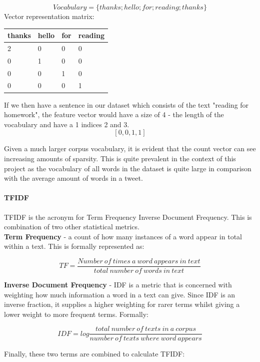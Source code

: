 \documentclass[conference]{IEEEtran}
\begin{document}
\[Vocabulary = \{thanks; hello; for; reading; thanks\} \] 
Vector representation matrix:
\begin{table}[H]
\centering
\begin{tabular}{|l|l|l|l|}
\hline
thanks & hello & for & reading \\ \hline
2      &   0   &  0  &    0 \\ \hline
0      &   1   &  0  &    0 \\ \hline
0      &   0   &  1  &    0 \\ \hline
0      &   0   &  0  &    1 \\ \hline
\end{tabular}
\end{table}

If we then have a sentence in our dataset which consists of the text "reading for homework", the feature vector would have a size of 4 - the length of the vocabulary and have a 1 indices 2 and 3.
\[ [0, 0, 1, 1]\]

Given a much larger corpus vocabulary, it is evident that the count vector can see increasing amounts of sparsity. This is quite prevalent in the context of this project as the vocabulary of all words in the dataset is quite large in comparison with the average amount of words in a tweet.\\

\paragraph{\textbf{TFIDF}}
TFIDF is the acronym for Term Frequency Inverse Document Frequency. This is combination of two other statistical metrics.\\
\textbf{Term Frequency} - a count of how many instances of a word appear in total within a text. This is formally represented as:

\[ TF = \frac{Number\: of\: times\: a\: word\: appears\: in\: text}{total\: number\: of\: words\: in\: text}\]

\textbf{Inverse Document Frequency} - IDF is a metric that is concerned with weighting how much information a word in a text can give. Since IDF is an inverse fraction, it supplies a higher weighting for rarer terms whilst giving a lower weight to more frequent terms. Formally:

\[ IDF = log \frac{total \: number \: of \: texts \: in \: a \: corpus}{number \:
of \: texts \: where \: word \: appears}\]

Finally, these two terms are combined to calculate TFIDF:
\end{document}
